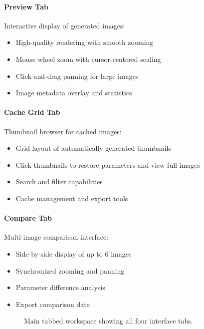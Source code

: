 \documentclass[11pt,a4paper]{article}
\begin{document}
\paragraph{Preview Tab}
Interactive display of generated images:
\begin{itemize}[leftmargin=*]
\item High-quality rendering with smooth zooming
\item Mouse wheel zoom with cursor-centered scaling
\item Click-and-drag panning for large images
\item Image metadata overlay and statistics
\end{itemize}

\paragraph{Cache Grid Tab}
Thumbnail browser for cached images:
\begin{itemize}[leftmargin=*]
\item Grid layout of automatically generated thumbnails
\item Click thumbnails to restore parameters and view full images
\item Search and filter capabilities
\item Cache management and export tools
\end{itemize}

\paragraph{Compare Tab}
Multi-image comparison interface:
\begin{itemize}[leftmargin=*]
\item Side-by-side display of up to 6 images
\item Synchronized zooming and panning
\item Parameter difference analysis
\item Export comparison data
\end{itemize}

\begin{figure}[H]
\centering
\caption{Main tabbed workspace showing all four interface tabs.}
\label{fig:tabs-interface}
\end{figure}
\end{document}

